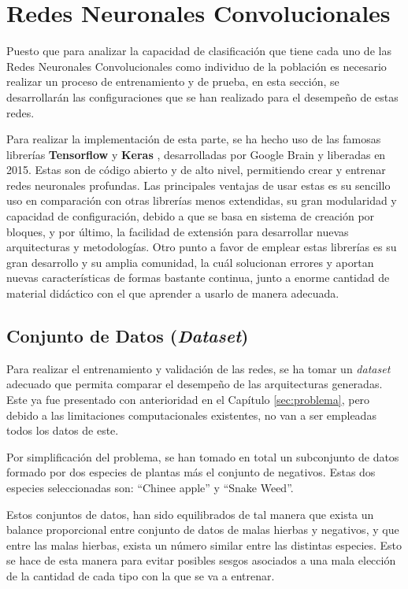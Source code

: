 \section{Redes Neuronales Convolucionales}

Puesto que para analizar la capacidad de clasificación que tiene cada uno de las Redes Neuronales Convolucionales como individuo de la población es necesario realizar un proceso de entrenamiento y de prueba, en esta sección, se desarrollarán las configuraciones que se han realizado para el desempeño de estas redes.

Para realizar la implementación de esta parte, se ha hecho uso de las famosas librerías \textbf{Tensorflow} \cite{tensorflow} y \textbf{Keras} \cite{keras}, desarrolladas por Google Brain y liberadas en 2015. Estas son de código abierto y de alto nivel, permitiendo crear y entrenar redes neuronales profundas. Las principales ventajas de usar estas es su sencillo uso en comparación con otras librerías menos extendidas, su gran modularidad y capacidad de configuración, debido a que se basa en sistema de creación por bloques, y por último, la facilidad de extensión para desarrollar nuevas arquitecturas y metodologías. Otro punto a favor de emplear estas librerías es su gran desarrollo y su amplia comunidad, la cuál solucionan errores y aportan nuevas características de formas bastante continua, junto a enorme cantidad de material didáctico con el que aprender a usarlo de manera adecuada.

\subsection{Conjunto de Datos (\textit{Dataset})}

Para realizar el entrenamiento y validación de las redes, se ha tomar un \textit{dataset} adecuado que permita comparar el desempeño de las arquitecturas generadas. Este ya fue presentado con anterioridad en el Capítulo \ref{sec:problema}, pero debido a las limitaciones computacionales existentes, no van a ser empleadas todos los datos de este.

Por simplificación del problema, se han tomado en total un subconjunto de datos formado por dos especies de plantas más el conjunto de negativos. Estas dos especies seleccionadas son: ``Chinee apple'' y ``Snake Weed''.


Estos conjuntos de datos, han sido equilibrados de tal manera que exista un balance proporcional entre conjunto de datos de malas hierbas y negativos, y que entre las malas hierbas, exista un número similar entre las distintas especies. Esto se hace de esta manera para evitar posibles sesgos asociados a una mala elección de la cantidad de cada tipo con la que se va a entrenar.

